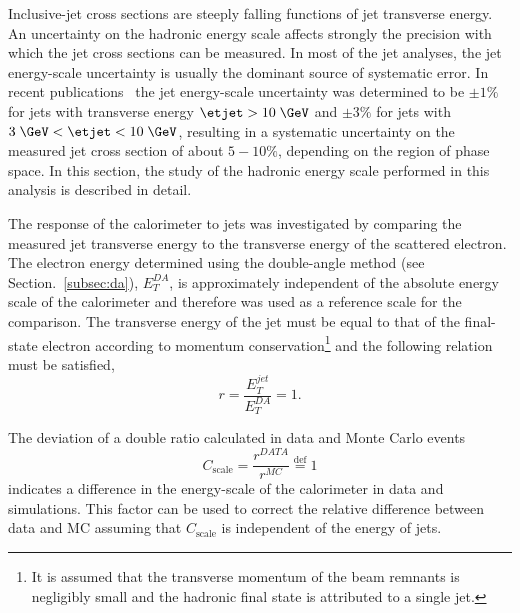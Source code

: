 Inclusive-jet cross sections are steeply falling functions of jet transverse energy. An uncertainty on the hadronic energy scale affects strongly the precision with which the jet cross sections can be measured. In most of the jet analyses, the jet energy-scale uncertainty is usually the dominant source of systematic error. In recent \zeus publications~\cite{epj:c70:965, np:b864:1} the jet energy-scale uncertainty was determined to be $\pm 1\%$ for jets with transverse energy $\etjet>10\; \GeV$ and $\pm 3\%$ for jets with $3\; \GeV<\etjet < 10\; \GeV$, resulting in a systematic uncertainty on the measured jet cross section of about $5-10\%$, depending on the region of phase space. In this section, the study of the hadronic energy scale performed in this analysis is described in detail.

The response of the calorimeter to jets was investigated by comparing the measured jet transverse energy to the transverse energy of the scattered electron. The electron energy determined using the double-angle method (see Section.~\ref{subsec:da}), $E_T^{DA}$, is approximately independent of the absolute energy scale of the calorimeter and therefore was used as a reference scale for the comparison. The transverse energy of the jet must be equal to that of the final-state electron according to momentum conservation\footnote{It is assumed that the transverse momentum of the beam remnants is negligibly small and the hadronic final state is attributed to a single jet.} and the following relation must be satisfied,
\begin{equation}
r = \frac{E_T^{jet}}{E_T^{DA}} = 1.
\label{eq:etjetetelbalance}
\end{equation}

The deviation of a double ratio calculated in data and Monte Carlo events
\begin{equation}
C_\text{scale} = \frac{r^{DATA}}{r^{MC}} \stackrel{\mathrm{def}}{=} 1
\label{eq:cscale}
\end{equation}
indicates a difference in the energy-scale of the calorimeter in data and simulations. This factor can be used to correct the relative difference between data and MC assuming that $C_\text{scale}$ is independent of the energy of jets. 

